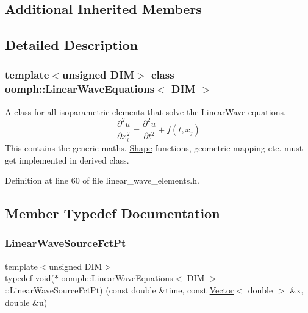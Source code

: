 \subsection*{Additional Inherited Members}


\subsection{Detailed Description}
\subsubsection*{template$<$unsigned D\+IM$>$\newline
class oomph\+::\+Linear\+Wave\+Equations$<$ D\+I\+M $>$}

A class for all isoparametric elements that solve the Linear\+Wave equations. \[ \frac{\partial^2 u}{\partial x_i^2}= \frac{\partial^2 u}{\partial t^2}+f(t,x_j) \] This contains the generic maths. \hyperlink{classoomph_1_1Shape}{Shape} functions, geometric mapping etc. must get implemented in derived class. 

Definition at line 60 of file linear\+\_\+wave\+\_\+elements.\+h.



\subsection{Member Typedef Documentation}
\mbox{\label{classoomph_1_1LinearWaveEquations_a9648dd63c18bab6854d362d16f01e33d}} 
\subsubsection{\texorpdfstring{Linear\+Wave\+Source\+Fct\+Pt}{LinearWaveSourceFctPt}}
{\footnotesize\ttfamily template$<$unsigned D\+IM$>$ \\
typedef void($\ast$ \hyperlink{classoomph_1_1LinearWaveEquations}{oomph\+::\+Linear\+Wave\+Equations}$<$ D\+IM $>$\+::Linear\+Wave\+Source\+Fct\+Pt) (const double \&time, const \hyperlink{classoomph_1_1Vector}{Vector}$<$ double $>$ \&x, double \&u)}



